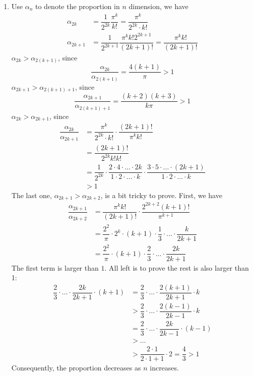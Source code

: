 \documentclass{homework}
\begin{document}
\begin{problem}{4}
\begin{enumerate}
\item
Use $\alpha_n$ to denote the proportion in $n$ dimension, we have
\begin{align*}
\alpha_{2k} &= \dfrac {1}{2^{2k}}\dfrac {\pi ^{k}}{k!}
=\dfrac {\pi ^{k}}{2^{2k}\cdot k!} \\
\alpha_{2k+1} &= \dfrac {1}{2^{2k+1}}\dfrac {\pi ^{k}k!2^{2k+1}}{(2k+1)!}
=\dfrac {\pi ^{k}k!}{(2k+1)!}
\end{align*}
$\alpha_{2k} > \alpha_{2(k+1)}$, since
$$\dfrac{\alpha_{2k}}{\alpha_{2(k+1)}} = \dfrac{4(k+1)}{\pi} > 1$$
$\alpha_{2k+1} > \alpha_{2(k+1)+1}$, since
$$\dfrac{\alpha_{2k+1}}{\alpha_{2(k+1)+1}} = \dfrac{(k+2)(k+3)}{k\pi} > 1$$
$\alpha_{2k} > \alpha_{2k+1}$, since
\begin{align*}
\dfrac{\alpha_{2k}}{\alpha_{2k+1}} &=
\dfrac {\pi ^{k}}{2^{2k}\cdot k!}\cdot \dfrac {( 2k+1) !}{\pi ^{k}k!}\\&=
\dfrac {(2k+1)!}{2^{2k}k!k!}\\&=
\dfrac {1}{2^{2k}}\cdot
\dfrac {2\cdot 4\cdot \ldots \cdot 2k}{1\cdot 2\cdot \ldots \cdot k}
\cdot \dfrac {3\cdot 5\cdot \ldots \cdot (2k+1)}{1\cdot 2\cdot \ldots \cdot k}\\
& > 1
\end{align*}
The last one, $\alpha_{2k+1} > \alpha_{2k+2}$, is a bit tricky to prove.
First, we have
\begin{align*}
\dfrac{\alpha_{2k+1}}{\alpha_{2k+2}} &=
\dfrac{\pi^k k!}{(2k+1)!}\cdot\dfrac{2^{2k+2}(k+1)!}{\pi^{k+1}} \\ &=
\dfrac{2^2}{\pi}\cdot2^k\cdot(k+1)\cdot
\dfrac{1}{3}\cdot\ldots\cdot\dfrac{k}{2k+1} \\ &=
\dfrac{2^2}{\pi}\cdot(k+1)\cdot\dfrac{2}{3}\cdot\ldots\cdot\dfrac{2k}{2k+1}
\end{align*}
The first term is larger than $1$. All left is to prove the rest is also
larger than 1:
\begin{align*}
\dfrac{2}{3}\cdot\ldots\cdot\dfrac{2k}{2k+1}\cdot(k+1) &=
\dfrac{2}{3}\cdot\ldots\cdot\dfrac{2(k+1)}{2k+1}\cdot k \\ &>
\dfrac{2}{3}\cdot\ldots\cdot\dfrac{2(k-1)}{2k-1}\cdot k \\ &=
\dfrac{2}{3}\cdot\ldots\cdot\dfrac{2k}{2k-1}\cdot (k-1) \\ &> \ldots \\
&> \dfrac{2\cdot1}{2\cdot1+1} \cdot 2 = \dfrac{4}{3} > 1
\end{align*}
Consequently, the proportion decreases as $n$ increases. \QED


\end{enumerate}
\end{problem}
\end{document}
